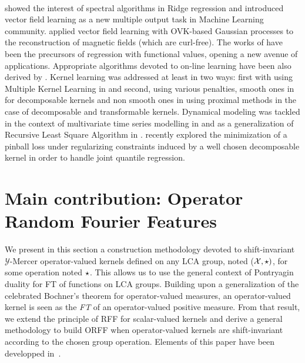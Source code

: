 \documentclass[twoside,11pt]{article}
\begin{document}
\paragraph{}
\citet{Macedo2008, Baldassare2012} showed the interest of spectral algorithms
in Ridge regression and introduced vector field learning as a new multiple
output task in Machine Learning community. \citet{Wahlstrom2013} applied vector
field learning with \acs{OVK}-based Gaussian processes to the reconstruction of
magnetic fields (which are curl-free).  The works of
\citet{Kadri_aistat10,kadri2015operator} have been the precursors of
regression with functional values, opening a new avenue of applications.
Appropriate algorithms devoted to on-line learning have been also derived  by
\citet{audiffren2013online}.  Kernel learning was addressed at least in two
ways: first with using Multiple Kernel Learning in \citet{Kadri_nips2012} and
second, using various penalties, smooth ones in \citet{Dinuzzo2011,
ciliberto2015} for decomposable kernels and non smooth ones in
\citet{lim2015operator} using proximal methods in the case of decomposable and
transformable kernels.  Dynamical modeling was tackled in the context of
multivariate time series modelling in
\citet{lim2013okvar,Sindhwani2013,lim2015operator} and as a generalization of
Recursive Least Square Algorithm in \citet{amblard2015operator}.
\citet{sangnier2016joint} recently explored the minimization of a pinball loss
under regularizing constraints induced by a well chosen decomposable kernel in
order to handle joint quantile regression.


\section{Main contribution: Operator Random Fourier Features}
\label{sec:ORFF_construction}
We present in this section a construction methodology devoted to
shift-invariant $\mathcal{Y}$-Mercer operator-valued kernels defined on any
\acf{LCA} group, noted ($\mathcal{X}, \star)$, for some operation noted
$\star$. This allows us to use the general context of Pontryagin duality for
\acl{FT} of functions on \acs{LCA} groups. Building upon a generalization of
the celebrated Bochner's theorem for operator-valued measures, an
operator-valued kernel is seen as the \emph{\acl{FT}} of an operator-valued
positive measure. From that result, we extend the principle of \acs{RFF} for
scalar-valued kernels and derive a general methodology to build \acf{ORFF} when
operator-valued kernels are shift-invariant according to the chosen group
operation. Elements of this paper have been developped
in~\citet{brault2016random}.
\end{document}
